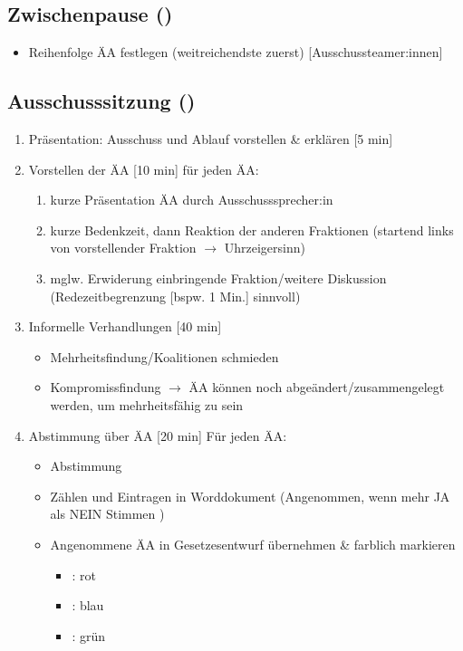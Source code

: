 \documentclass{article}
\begin{document}
	\subsection{Zwischenpause (\timePauseOne)}
	\begin{itemize}
		\item Reihenfolge ÄA festlegen (weitreichendste zuerst) [Ausschussteamer:innen]
	\end{itemize}
	
	\subsection{Ausschusssitzung (\timeAuss)}
	\begin{enumerate}
		\item Präsentation: Ausschuss und Ablauf vorstellen \& erklären [5 min]
        \item Vorstellen der ÄA [10 min] \newline
        für jeden ÄA:
        \begin{enumerate}
            \item kurze Präsentation ÄA durch Ausschusssprecher:in
			\item kurze Bedenkzeit, dann Reaktion der anderen Fraktionen (startend links von vorstellender Fraktion $\to$ Uhrzeigersinn)
            \item mglw. Erwiderung einbringende Fraktion/weitere Diskussion \newline (Redezeitbegrenzung [bspw. 1 Min.] sinnvoll)
        \end{enumerate}
		\item Informelle Verhandlungen [40 min]
		\begin{itemize}
			\item Mehrheitsfindung/Koalitionen schmieden
			\item Kompromissfindung $\to$ ÄA können noch abgeändert/zusammengelegt werden, um mehrheitsfähig zu sein
		\end{itemize}
		\item Abstimmung über ÄA [20 min]\newline
		Für jeden ÄA:
		\begin{itemize}
			\item Abstimmung
			\item Zählen und Eintragen in Worddokument \newline
            (Angenommen, wenn mehr JA als NEIN Stimmen )
            \item Angenommene ÄA in Gesetzesentwurf übernehmen \& farblich markieren
            \begin{itemize}
                \item \ausschussOne: rot
                \item \ausschussTwo: blau
                \item \ausschussThree: grün
            \end{itemize}
		\end{itemize}
	\end{enumerate}
	
\end{document}
